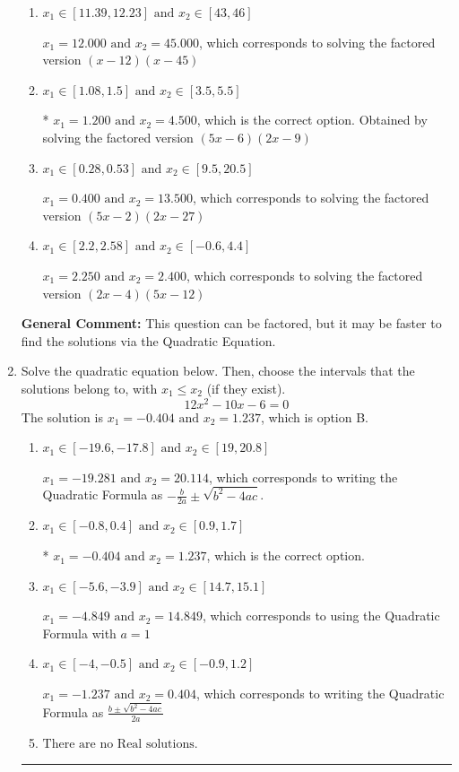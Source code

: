 \documentclass{extbook}[14pt]
\newcommand{\litem}[1]{\item #1

\rule{\textwidth}{0.4pt}}
\begin{document}
\begin{enumerate}
{\begin{enumerate}[label=\Alph*.]
$x_1 = 0.900 \text{ and } x_2 = 6.000$, which corresponds to solving the factored version $(10x -9)(x -6)$
\item \( x_1 \in [11.39, 12.23] \text{ and } x_2 \in [43, 46] \)

$x_1 = 12.000 \text{ and } x_2 = 45.000$, which corresponds to solving the factored version $(x -12)(x -45)$
\item \( x_1 \in [1.08, 1.5] \text{ and } x_2 \in [3.5, 5.5] \)

* $x_1 = 1.200 \text{ and } x_2 = 4.500$, which is the correct option. Obtained by solving the factored version $(5x -6)(2x -9)$
\item \( x_1 \in [0.28, 0.53] \text{ and } x_2 \in [9.5, 20.5] \)

$x_1 = 0.400 \text{ and } x_2 = 13.500$, which corresponds to solving the factored version $(5x -2)(2x -27)$
\item \( x_1 \in [2.2, 2.58] \text{ and } x_2 \in [-0.6, 4.4] \)

$x_1 = 2.250 \text{ and } x_2 = 2.400$, which corresponds to solving the factored version $(2x -4)(5x -12)$
\end{enumerate}

\textbf{General Comment:} This question can be factored, but it may be faster to find the solutions via the Quadratic Equation.
}
\litem{
Solve the quadratic equation below. Then, choose the intervals that the solutions belong to, with $x_1 \leq x_2$ (if they exist).
\[ 12x^{2} -10 x -6 = 0 \]The solution is \( x_1 = -0.404 \text{ and } x_2 = 1.237 \), which is option B.\begin{enumerate}[label=\Alph*.]
\item \( x_1 \in [-19.6, -17.8] \text{ and } x_2 \in [19, 20.8] \)

 $x_1 = -19.281 \text{ and } x_2 = 20.114$, which corresponds to writing the Quadratic Formula as $-\frac{b}{2a} \pm \sqrt{b^2 - 4ac}$.
\item \( x_1 \in [-0.8, 0.4] \text{ and } x_2 \in [0.9, 1.7] \)

* $x_1 = -0.404 \text{ and } x_2 = 1.237$, which is the correct option.
\item \( x_1 \in [-5.6, -3.9] \text{ and } x_2 \in [14.7, 15.1] \)

 $x_1 = -4.849 \text{ and } x_2 = 14.849$, which corresponds to using the Quadratic Formula with $a=1$
\item \( x_1 \in [-4, -0.5] \text{ and } x_2 \in [-0.9, 1.2] \)

 $x_1 = -1.237 \text{ and } x_2 = 0.404$, which corresponds to writing the Quadratic Formula as $\frac{b \pm \sqrt{b^2 - 4ac}}{2a}$
\item \( \text{There are no Real solutions.} \)


\end{enumerate}}
\end{enumerate}
\end{document}
